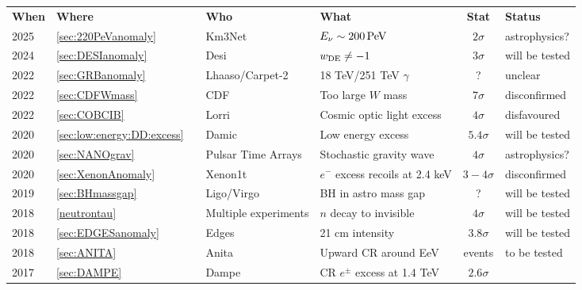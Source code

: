 \begin{table}[p]
\hspace*{-1.5cm}
\small
\begin{tabular}{lllllcl}
\bf When & \multicolumn{2}{l}{\bf  Where} & \bf  Who & \bf What & \bf Stat   & \bf  Status\\ 
\rowcolor{yellow!20} 2025 & \ref{sec:220PeVanomaly}&\cite{220PeVanomaly} & {\sc Km3Net} & 
$E_\nu\sim 200\,{\rm PeV}$ & $2\sigma$ & astrophysics?\\
%
\rowcolor{green!5} 2024 & \ref{sec:DESIanomaly}&\cite{DESIanomaly} & {\sc Desi} & 
$w_{\rm DE}\neq -1 $ & $3\sigma$ & will be tested\\
%
\rowcolor{yellow!5} 2022 & \ref{sec:GRBanomaly}&\cite{GRBanomaly} & {\sc Lhaaso}/{\sc Carpet-2} & 
18 TeV/251 TeV $\gamma$ & ? & unclear\\
%
\rowcolor{red!50} 2022 &\ref{sec:CDFWmass} &\cite{WmassAnomaly} & {\sc CDF}& Too large $W$ mass & $7\sigma$ 
& disconfirmed\\
%
\rowcolor{yellow!20} 2022 & \ref{sec:COBCIB}&\cite{COBexcess} & {\sc Lorri} & 
Cosmic optic light excess & $4\sigma$ & disfavoured \\
%
\rowcolor{green!10} 2020 &\ref{sec:low:energy:DD:excess} &\cite{Low:energy:excesses} & {\sc Damic}& Low energy excess & $5.4\sigma$ 
& will be tested\\
%
\rowcolor{green!30}2020 & \ref{sec:NANOgrav}&\cite{PTA} & Pulsar Time Arrays 
& Stochastic gravity wave & $4\sigma$ 
& astrophysics?\\
%
\rowcolor{red!50}2020 & \ref{sec:XenonAnomaly}&\cite{XenonAnomaly} & {\sc Xenon1t} & $e^-$ excess recoils at 2.4 keV & $3-4\sigma$ 
& disconfirmed\\
%
\rowcolor{green!10} 2019 & \ref{sec:BHmassgap}&\cite{DMandBHmassgap} & {\sc Ligo}/{\sc Virgo} & BH in astro mass gap  & ? 
& will be tested\\
%
\rowcolor{green!10} 2018 & \ref{neutrontau}&\cite{NeutronBottleAnomaly} & Multiple experiments & $n$ decay to invisible  & $4\sigma$ 
& will be tested\\
%
\rowcolor{yellow!20} 2018 & \ref{sec:EDGESanomaly}&\cite{EDGES} & {\sc Edges} & 21 cm intensity & $3.8\sigma$ 
& will be tested\\
%
\rowcolor{green!10} 2018 & \ref{sec:ANITA}&\cite{ANITAanomaly} & {\sc Anita} & Upward CR around EeV & events 
& to be tested\\
%
\rowcolor{orange!20} 2017 & \ref{sec:DAMPE}&\cite{DAMPEexcess} & {\sc Dampe} & CR $e^\pm$ excess at 1.4 TeV & $2.6\sigma$ 

\end{tabular}
\end{table}
